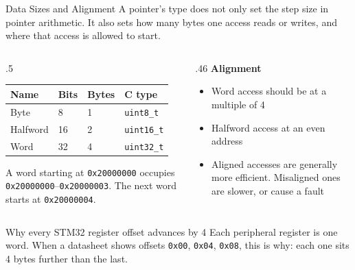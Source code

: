 \documentclass[9pt,aspectratio=169,xcolor=table]{beamer}
\begin{document}
\begin{frame}{Data Sizes and Alignment}
    \leavevmode
    {\small A pointer's type does not only set the step size in pointer
    arithmetic. It also sets how many bytes one access reads or writes,
    and where that access is allowed to start.}

    \begin{columns}[T]
    \begin{column}{.5\textwidth}
        {\small
        \striped
        \begin{tabular}{@{}l l l l@{}}
            \toprule
            \textbf{Name} & \textbf{Bits} & \textbf{Bytes} & \textbf{C type} \\
            \midrule
            Byte     & 8  & 1 & \texttt{uint8\_t} \\
            Halfword & 16 & 2 & \texttt{uint16\_t} \\
            Word     & 32 & 4 & \texttt{uint32\_t} \\
            \bottomrule
        \end{tabular}}

        \vspace{3mm}
        {\small A word starting at \texttt{0x20000000} occupies
        \texttt{0x20000000}--\texttt{0x20000003}. The next word starts at
        \texttt{0x20000004}.}
    \end{column}
    \begin{column}{.46\textwidth}
        \textbf{Alignment}
        {\small
        \begin{itemize}\itemsep1pt
            \item Word access should be at a \alert{multiple of 4}
            \item Halfword access at an \alert{even} address
            \item Aligned accesses are generally more efficient.
                  Misaligned ones are slower, or cause a fault
        \end{itemize}}
    \end{column}
    \end{columns}

    \vspace{3mm}
    \begin{block}{Why every STM32 register offset advances by 4}
        Each peripheral register is one \alert{word}. When a datasheet
        shows offsets \texttt{0x00}, \texttt{0x04}, \texttt{0x08}, this
        is why: each one sits 4 bytes further than the last.
    \end{block}
\end{frame}
\end{document}
